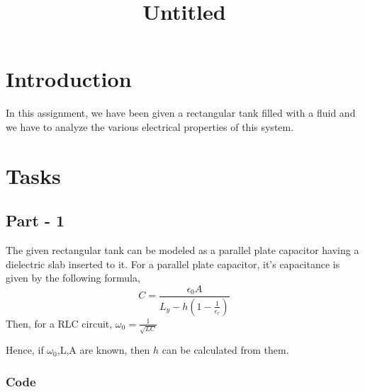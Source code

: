 \documentclass[11pt]{article}
\title{Untitled}
\begin{document}
    
    \maketitle
    
    

    
    \hypertarget{introduction}{%
\section{Introduction}\label{introduction}}

In this assignment, we have been given a rectangular tank filled with a
fluid and we have to analyze the various electrical properties of this
system.

    \hypertarget{tasks}{%
\section{Tasks}\label{tasks}}

    \hypertarget{part---1}{%
\subsection{Part - 1}\label{part---1}}

The given rectangular tank can be modeled as a parallel plate capacitor
having a dielectric slab inserted to it. For a parallel plate capacitor,
it's capacitance is given by the following formula,
\[ C=\frac{\epsilon_0 A}{L_y-h(1-\frac{1}{\epsilon_r})} \] Then, for a
RLC circuit, \(\omega_0=\frac{1}{\sqrt{LC}}\)

Hence, if \(\omega_0\),L,A are known, then \(h\) can be calculated from
them.

    \hypertarget{code}{%
\subsubsection{Code}\label{code}}
\end{document}
